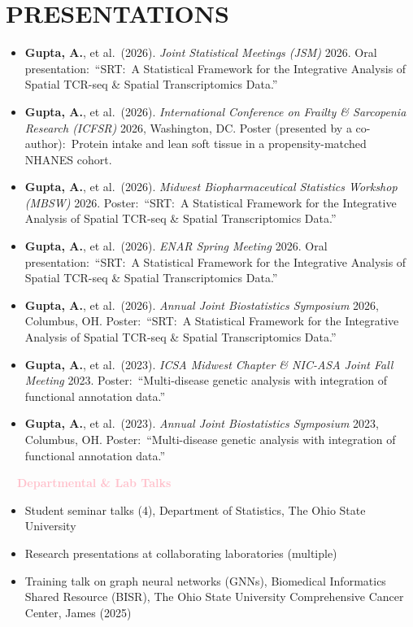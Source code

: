 \documentclass[11pt,a4paper,roman]{moderncv}        %
\begin{document}
\section{PRESENTATIONS}
\begin{itemize}
\item \textbf{Gupta, A.}, et al.\ (2026). \textit{Joint Statistical Meetings (JSM)} 2026. Oral presentation:\ ``SRT:\ A Statistical Framework for the Integrative Analysis of Spatial TCR-seq \& Spatial Transcriptomics Data.''
\vskip 0.1cm
\item \textbf{Gupta, A.}, et al.\ (2026). \textit{International Conference on Frailty \& Sarcopenia Research (ICFSR)} 2026, Washington, DC. Poster (presented by a co-author):\ Protein intake and lean soft tissue in a propensity-matched NHANES cohort.
\vskip 0.1cm
\item \textbf{Gupta, A.}, et al.\ (2026). \textit{Midwest Biopharmaceutical Statistics Workshop (MBSW)} 2026. Poster:\ ``SRT:\ A Statistical Framework for the Integrative Analysis of Spatial TCR-seq \& Spatial Transcriptomics Data.''
\vskip 0.1cm
\item \textbf{Gupta, A.}, et al.\ (2026). \textit{ENAR Spring Meeting} 2026. Oral presentation:\ ``SRT:\ A Statistical Framework for the Integrative Analysis of Spatial TCR-seq \& Spatial Transcriptomics Data.''
\vskip 0.1cm
\item \textbf{Gupta, A.}, et al.\ (2026). \textit{Annual Joint Biostatistics Symposium} 2026, Columbus, OH. Poster:\ ``SRT:\ A Statistical Framework for the Integrative Analysis of Spatial TCR-seq \& Spatial Transcriptomics Data.''
\vskip 0.1cm
\item \textbf{Gupta, A.}, et al.\ (2023). \textit{ICSA Midwest Chapter \& NIC-ASA Joint Fall Meeting} 2023. Poster:\ ``Multi-disease genetic analysis with integration of functional annotation data.''
\vskip 0.1cm
\item \textbf{Gupta, A.}, et al.\ (2023). \textit{Annual Joint Biostatistics Symposium} 2023, Columbus, OH. Poster:\ ``Multi-disease genetic analysis with integration of functional annotation data.''
\end{itemize}
\vskip 0.2cm
\textbf{\textcolor{pink}{\large{$\quad$Departmental \& Lab Talks}}}
\vskip 0.2cm
\begin{itemize}
\item Student seminar talks (4), Department of Statistics, The Ohio State University
\vskip 0.1cm
\item Research presentations at collaborating laboratories (multiple)
\vskip 0.1cm
\item Training talk on graph neural networks (GNNs), Biomedical Informatics Shared Resource (BISR), The Ohio State University Comprehensive Cancer Center, James (2025)
\end{itemize}
\end{document}
